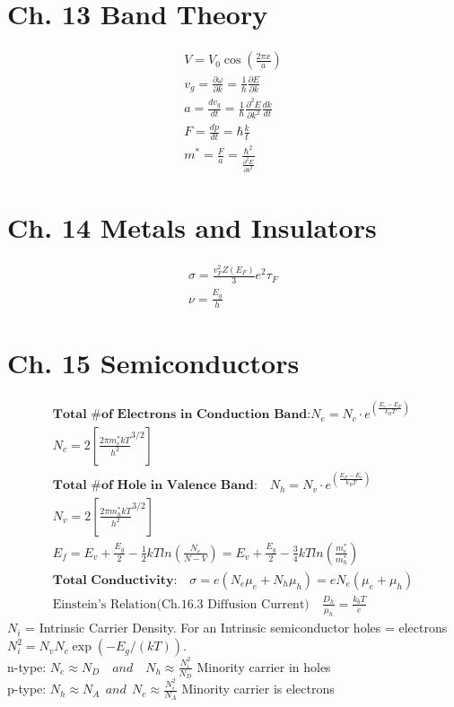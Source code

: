 \begin{multicols}{3}
\section{Ch. 13 Band Theory}
\begin{align}
V= V_0 \cos\left( \frac{2 \pi x}{a}\right) \\
v_g = \frac{ \partial \omega}{ \partial k} =\frac{1}{\hbar} \frac{ \partial E}{\partial k} \\
a = \frac{d v_g}{ d t}= \frac{1}{\hbar} \frac{ \partial^2 E}{ \partial k^2}
\frac {d k}{d t}	\\
F = \frac {dp}{dt}= \hbar \frac{k}{t} \\
m^*=\frac{F}{a}=\frac{\hbar^2}
{\frac{\partial^2 E}{\partial k^2}}
\end{align}
\section{Ch. 14 Metals and Insulators}
\begin{align}
\sigma = \frac{v_F^2Z(E_F)}{3}e^2\tau_F \\
\nu = \frac{E_g}{h}
\end{align}
\section{Ch. 15 Semiconductors}
\begin{align*}
\textbf{Total \# of Electrons in
	Conduction Band:} N_e = N_c \cdot e^{\left(\frac{E_c-E_F}{k_BT}\right)} \\
N_c = 2 \left[\frac{2\pi m_e^*kT}{h^2}^{3/2}\right] \\
\textbf{Total \# of Hole in
	Valence Band:} \quad N_h = N_v \cdot e^{\left(\frac{E_F-E_v}{k_BT}\right)} \\
N_v = 2 \left[\frac{2\pi m_h^*kT}{h^2}^{3/2}\right] \\
E_f=E_v+\frac{E_g}{2}-\frac{1}{2}kTln\left(\frac{N_c}{N-V}\right)=
E_v+\frac{E_g}{2}-\frac{3}{4}kTln\left(\frac{m_e^*}{m_h^*}\right) \\
\textbf{Total Conductivity:} \quad \sigma =e(N_e\mu_e+
N_h\mu_h)=eN_e(\mu_e+\mu_h) \\
\text{Einstein's Relation(Ch.16.3 Diffusion Current)} \quad \frac{D_h}{\mu_h} = \frac{k_bT}{e} 
\end{align*}  $N_i$ = Intrinsic Carrier Density. For an Intrinsic semiconductor holes = electrons
$N_i^2=N_vN_c\exp(-E_g/(kT))$. \\ n-type: $N_e \approx N_D \quad and \quad N_h \approx \frac{N_i^2}{N_D}$ Minority carrier in %
holes \\
p-type: $N_h \approx N_A \ \ and \ \ N_e \approx \frac{N_i^2}{N_A}$
Minority
carrier %
is
electrons
\end{multicols}